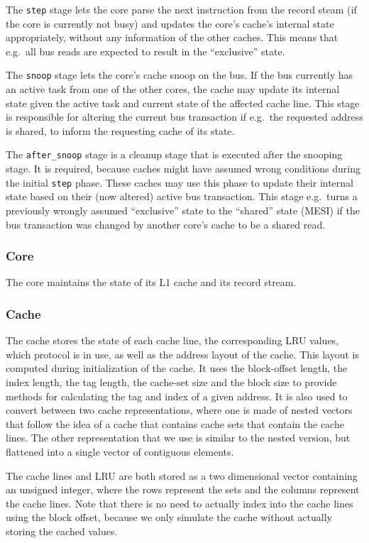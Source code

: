 The \texttt{step} stage lets the core parse the next instruction from the record steam (if the core
is currently not busy) and updates the core's cache's internal state appropriately, without any
information of the other caches. This means that e.g.\ all bus reads are expected to result in the
``exclusive'' state.

The \texttt{snoop} stage lets the core's cache snoop on the bus.
If the bus currently has an active task from one of the other cores, the cache may update its
internal state given the active task and current state of the affected cache line. This stage is
responsible for altering the current bus transaction if e.g.\ the requested address is shared, to
inform the requesting cache of its state.

The \texttt{after\_snoop} stage is a cleanup stage that is executed after the snooping stage.
It is required, because caches might have assumed wrong conditions during the initial \texttt{step}
phase. These caches may use this phase to update their internal state based on their (now altered)
active bus transaction. This stage e.g.\ turns a previously wrongly assumed ``exclusive'' state to
the ``shared'' state (MESI) if the bus transaction was changed by another core's cache to be a
shared read.

\subsubsection{Core}
The core maintains the state of its L1 cache and its record stream.

\subsubsection{Cache}
The cache stores the state of each cache line, the corresponding LRU values, which
protocol is in use, as well as the address layout of the cache. This layout is computed during
initialization of the cache. It uses the block-offset length, the index length, the tag length,
the cache-set size and the block size to provide methods for calculating the tag and index of a
given address. It is also used to convert between two cache representations, where one is made of
nested vectors that follow the idea of a cache that contains cache sets that contain the cache
lines. The other representation that we use is similar to the nested version, but flattened into a
single vector of contiguous elements.

The cache lines and LRU are both stored as a two dimensional vector containing an unsigned integer,
where the rows represent the sets and the columns represent the cache lines. Note that there is no need
to actually index into the cache lines using the block offset, because we only simulate the cache
without actually storing the cached values.

